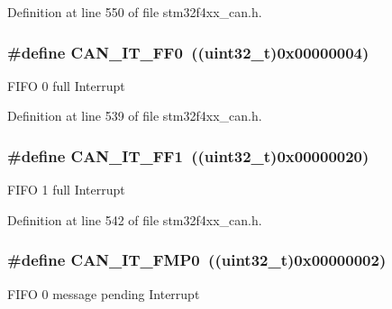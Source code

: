 Definition at line 550 of file stm32f4xx\-\_\-can.\-h.

\hypertarget{group___c_a_n__interrupts_gabf63043d9216de80ddc7ffe57b23ef67}{
\subsubsection[{C\-A\-N\-\_\-\-I\-T\-\_\-\-F\-F0}]{\setlength{\rightskip}{0pt plus 5cm}\#define C\-A\-N\-\_\-\-I\-T\-\_\-\-F\-F0~((uint32\-\_\-t)0x00000004)}}\label{group___c_a_n__interrupts_gabf63043d9216de80ddc7ffe57b23ef67}
F\-I\-F\-O 0 full Interrupt 

Definition at line 539 of file stm32f4xx\-\_\-can.\-h.

\hypertarget{group___c_a_n__interrupts_ga93b86d884ce0624b4b36c991fd75fc1c}{
\subsubsection[{C\-A\-N\-\_\-\-I\-T\-\_\-\-F\-F1}]{\setlength{\rightskip}{0pt plus 5cm}\#define C\-A\-N\-\_\-\-I\-T\-\_\-\-F\-F1~((uint32\-\_\-t)0x00000020)}}\label{group___c_a_n__interrupts_ga93b86d884ce0624b4b36c991fd75fc1c}
F\-I\-F\-O 1 full Interrupt 

Definition at line 542 of file stm32f4xx\-\_\-can.\-h.

\hypertarget{group___c_a_n__interrupts_ga3fe6fbf53e9d692957e87ad329bcd362}{
\subsubsection[{C\-A\-N\-\_\-\-I\-T\-\_\-\-F\-M\-P0}]{\setlength{\rightskip}{0pt plus 5cm}\#define C\-A\-N\-\_\-\-I\-T\-\_\-\-F\-M\-P0~((uint32\-\_\-t)0x00000002)}}\label{group___c_a_n__interrupts_ga3fe6fbf53e9d692957e87ad329bcd362}
F\-I\-F\-O 0 message pending Interrupt 

